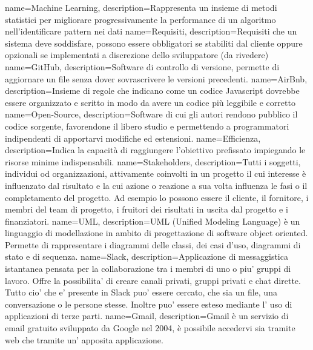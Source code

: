 {
    name=Machine Learning,
    description={Rappresenta un insieme di metodi statistici per migliorare progressivamente la performance di un algoritmo nell'identificare pattern nei dati}
}
{
    name=Requisiti,
    description={Requisiti che un sistema deve soddisfare, possono essere obbligatori se stabiliti dal cliente oppure opzionali se implementati a discrezione dello sviluppatore (da rivedere)}
}
{
    name=GitHub,
    description={Software di controllo di versione, permette di aggiornare un file senza dover sovrascrivere le versioni precedenti.}
}
{
    name=AirBnb,
    description={Insieme di regole che indicano come un codice Javascript dovrebbe essere organizzato e scritto in modo da avere un codice più leggibile e corretto}
}
{
    name=Open-Source,
    description={Software di cui gli autori rendono pubblico il codice sorgente, favorendone il libero studio e permettendo a programmatori indipendenti di apportarvi modifiche ed estensioni.}
}
{
    name=Efficienza,
    description={Indica la capacità di raggiungere l'obiettivo prefissato impiegando le risorse minime indispensabili.}
}
{
    name=Stakeholders,
    description={Tutti i soggetti, individui od organizzazioni, attivamente coinvolti in un progetto il cui interesse è influenzato dal risultato e la cui azione o reazione a sua volta influenza le fasi o il completamento del progetto. Ad esempio lo possono essere il cliente, il fornitore, i membri del team di progetto, i fruitori dei risultati in uscita dal progetto e i finanziatori.}
}
{
    name=UML,
    description={UML (Unified Modeling Language) è un linguaggio di modellazione in ambito di progettazione di software object oriented. Permette di rappresentare i diagrammi delle classi, dei casi d'uso, diagrammi di stato e di sequenza.}
}
{
    name=Slack,
    description={Applicazione di messaggistica istantanea pensata per la collaborazione tra i membri di uno o piu' gruppi di lavoro. Offre la possibilita' di creare canali privati, gruppi privati e chat dirette. Tutto cio' che e' presente in Slack puo' essere cercato, che sia un file, una conversazione o le persone stesse. Inoltre puo' essere esteso mediante l' uso di applicazioni di terze parti.}
}
{
    name=Gmail,
    description={Gmail è un servizio di email gratuito sviluppato da Google nel 2004, è possibile accedervi sia tramite web che tramite un' apposita applicazione.}
}
